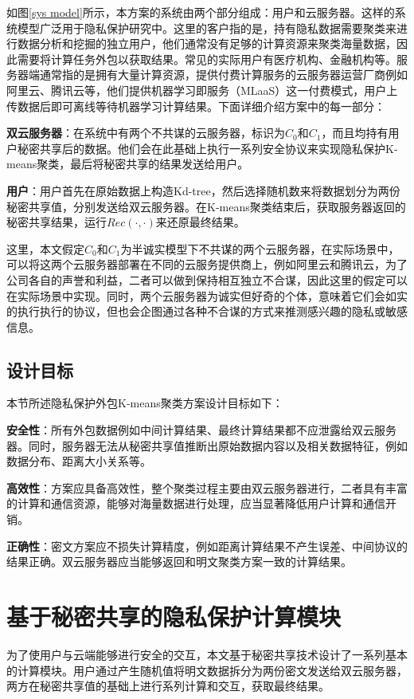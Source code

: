 如图\ref{sys model}所示，本方案的系统由两个部分组成：用户和云服务器。这样的系统模型广泛用于隐私保护研究中\cite{wu2020secure,bunn2007secure}。这里的客户指的是，持有隐私数据需要聚类来进行数据分析和挖掘的独立用户，他们通常没有足够的计算资源来聚类海量数据，因此需要将计算任务外包以获取结果。常见的实际用户有医疗机构、金融机构等。服务器端通常指的是拥有大量计算资源，提供付费计算服务的云服务器运营厂商例如阿里云、腾讯云等，他们提供机器学习即服务（MLaaS）这一付费模式，用户上传数据后即可离线等待机器学习计算结果。下面详细介绍方案中的每一部分：

\begin{compactitem}
	\item \textbf{双云服务器}：在系统中有两个不共谋的云服务器，标识为$ C_0 $和$ C_1 $，而且均持有用户秘密共享后的数据。他们会在此基础上执行一系列安全协议来实现隐私保护K-means聚类，最后将秘密共享的结果发送给用户。
	\item \textbf{用户}：用户首先在原始数据上构造Kd-tree，然后选择随机数来将数据划分为两份秘密共享值，分别发送给双云服务器。在K-means聚类结束后，获取服务器返回的秘密共享结果，运行$ Rec(\cdot,\cdot) $来还原最终结果。
\end{compactitem}

这里，本文假定$C_0$和$C_1$为半诚实模型下不共谋的两个云服务器，在实际场景中，可以将这两个云服务器部署在不同的云服务提供商上，例如阿里云和腾讯云，为了公司各自的声誉和利益，二者可以做到保持相互独立不合谋，因此这里的假定可以在实际场景中实现。同时，两个云服务器为诚实但好奇的个体，意味着它们会如实的执行执行的协议，但也会企图通过各种不合谋的方式来推测感兴趣的隐私或敏感信息。
\subsection{设计目标}
本节所述隐私保护外包K-means聚类方案设计目标如下：
\begin{compactitem}
	\item \textbf{安全性}：所有外包数据例如中间计算结果、最终计算结果都不应泄露给双云服务器。同时，服务器无法从秘密共享值推断出原始数据内容以及相关数据特征，例如数据分布、距离大小关系等。
	\item \textbf{高效性}：方案应具备高效性，整个聚类过程主要由双云服务器进行，二者具有丰富的计算和通信资源，能够对海量数据进行处理，应当显著降低用户计算和通信开销。
	\item \textbf{正确性}：密文方案应不损失计算精度，例如距离计算结果不产生误差、中间协议的结果正确。双云服务器应当能够返回和明文聚类方案一致的计算结果。
\end{compactitem}
\section{基于秘密共享的隐私保护计算模块}
\label{s3-mokuai}
为了使用户与云端能够进行安全的交互，本文基于秘密共享技术设计了一系列基本的计算模块。用户通过产生随机值将明文数据拆分为两份密文发送给双云服务器，两方在秘密共享值的基础上进行系列计算和交互，获取最终结果。

